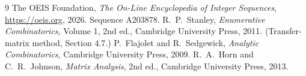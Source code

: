\documentclass[11pt,a4paper]{article}
\theoremstyle{plain}
\theoremstyle{definition}
\begin{document}
\begin{thebibliography}{9}
 The OEIS Foundation, \emph{The On-Line Encyclopedia of Integer
Sequences}, \url{https://oeis.org}, 2026. Sequence A203878.
 R.~P.~Stanley, \emph{Enumerative Combinatorics}, Volume 1, 2nd ed.,
Cambridge University Press, 2011. (Transfer-matrix method, Section 4.7.)
 P.~Flajolet and R.~Sedgewick, \emph{Analytic Combinatorics}, Cambridge
University Press, 2009.
 R.~A.~Horn and C.~R.~Johnson, \emph{Matrix Analysis}, 2nd ed., Cambridge
University Press, 2013.
\end{thebibliography}
\end{document}
